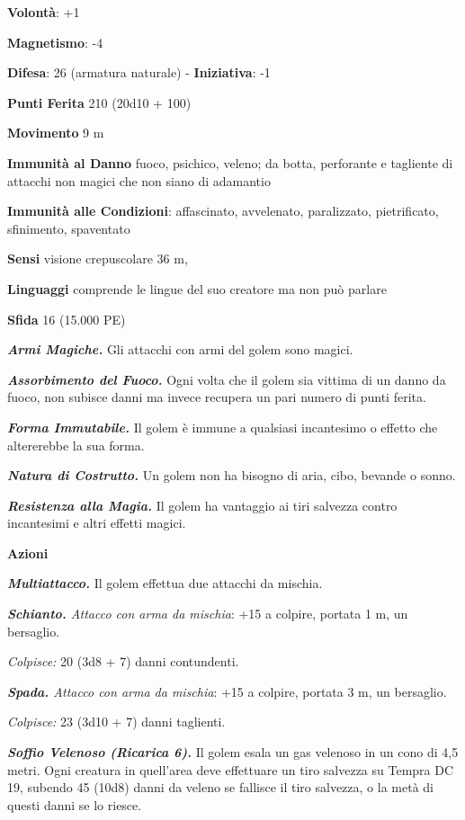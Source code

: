 \begin{multicols}{2}
\textbf{Volontà}: +1

\textbf{Magnetismo}: -4

\textbf{Difesa}: 26 (armatura naturale) - \textbf{Iniziativa}: -1

\textbf{Punti Ferita} 210 (20d10 + 100)

\textbf{Movimento} 9 m

\textbf{Immunità al Danno} fuoco, psichico, veleno; da botta,
perforante e tagliente di attacchi non magici che non siano di adamantio

\textbf{Immunità alle Condizioni}: affascinato, avvelenato, paralizzato,
pietrificato, sfinimento, spaventato

\textbf{Sensi} visione crepuscolare 36 m, 

\textbf{Linguaggi} comprende le lingue del suo creatore ma non può
parlare

\textbf{Sfida} 16 (15.000 PE)\smallskip

\emph{\textbf{Armi Magiche.}} Gli attacchi con armi del golem sono
magici.

\emph{\textbf{Assorbimento del Fuoco.}} Ogni volta che il golem sia
vittima di un danno da fuoco, non subisce danni ma invece recupera un
pari numero di punti ferita.

\emph{\textbf{Forma Immutabile.}} Il golem è immune a qualsiasi
incantesimo o effetto che altererebbe la sua forma.

\emph{\textbf{Natura di Costrutto.}} Un golem non ha bisogno di aria,
cibo, bevande o sonno.

\emph{\textbf{Resistenza alla Magia.}} Il golem ha vantaggio ai tiri
salvezza contro incantesimi e altri effetti magici.

\smallskip\textbf{Azioni}

\emph{\textbf{Multiattacco.}} Il golem effettua due attacchi da mischia.

\emph{\textbf{Schianto.} Attacco con arma da mischia}: +15 a colpire,
portata 1 m, un bersaglio.

\emph{Colpisce:} 20 (3d8 + 7) danni contundenti.

\emph{\textbf{Spada.} Attacco con arma da mischia}: +15 a colpire,
portata 3 m, un bersaglio.

\emph{Colpisce:} 23 (3d10 + 7) danni taglienti.

\emph{\textbf{Soffio Velenoso (Ricarica 6).}} Il golem esala un gas
velenoso in un cono di 4,5 metri. Ogni creatura in quell'area deve
effettuare un tiro salvezza su Tempra DC 19, subendo 45 (10d8)
danni da veleno se fallisce il tiro salvezza, o la metà di questi danni
se lo riesce.


\end{multicols}
